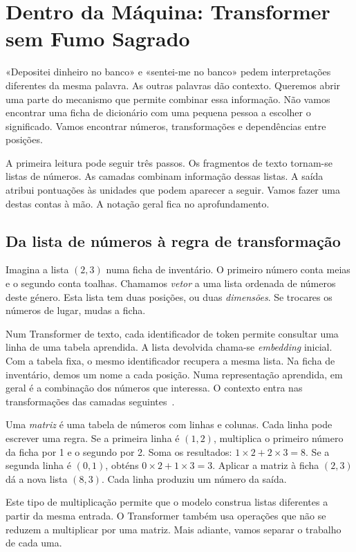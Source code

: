 \chapter{Dentro da Máquina: Transformer sem Fumo Sagrado}
\label{ch:transformer}

«Depositei dinheiro no banco» e «sentei-me no banco» pedem interpretações diferentes da mesma palavra. As outras palavras dão contexto. Queremos abrir uma parte do mecanismo que permite combinar essa informação. Não vamos encontrar uma ficha de dicionário com uma pequena pessoa a escolher o significado. Vamos encontrar números, transformações e dependências entre posições.

A primeira leitura pode seguir três passos. Os fragmentos de texto tornam-se listas de números. As camadas combinam informação dessas listas. A saída atribui pontuações às unidades que podem aparecer a seguir. Vamos fazer uma destas contas à mão. A notação geral fica no aprofundamento.

\section{Da lista de números à regra de transformação}

Imagina a lista $(2,3)$ numa ficha de inventário. O primeiro número conta meias e o segundo conta toalhas. Chamamos \emph{vetor} a uma lista ordenada de números deste género. Esta lista tem duas posições, ou duas \emph{dimensões}. Se trocares os números de lugar, mudas a ficha.

Num Transformer de texto, cada identificador de token permite consultar uma linha de uma tabela aprendida. A lista devolvida chama-se \emph{embedding} inicial. Com a tabela fixa, o mesmo identificador recupera a mesma lista. Na ficha de inventário, demos um nome a cada posição. Numa representação aprendida, em geral é a combinação dos números que interessa. O contexto entra nas transformações das camadas seguintes~\citep{vaswani2017}.

Uma \emph{matriz} é uma tabela de números com linhas e colunas. Cada linha pode escrever uma regra. Se a primeira linha é $(1,2)$, multiplica o primeiro número da ficha por 1 e o segundo por 2. Soma os resultados: $1\times2+2\times3=8$. Se a segunda linha é $(0,1)$, obténs $0\times2+1\times3=3$. Aplicar a matriz à ficha $(2,3)$ dá a nova lista $(8,3)$. Cada linha produziu um número da saída.

Este tipo de multiplicação permite que o modelo construa listas diferentes a partir da mesma entrada. O Transformer também usa operações que não se reduzem a multiplicar por uma matriz. Mais adiante, vamos separar o trabalho de cada uma.

